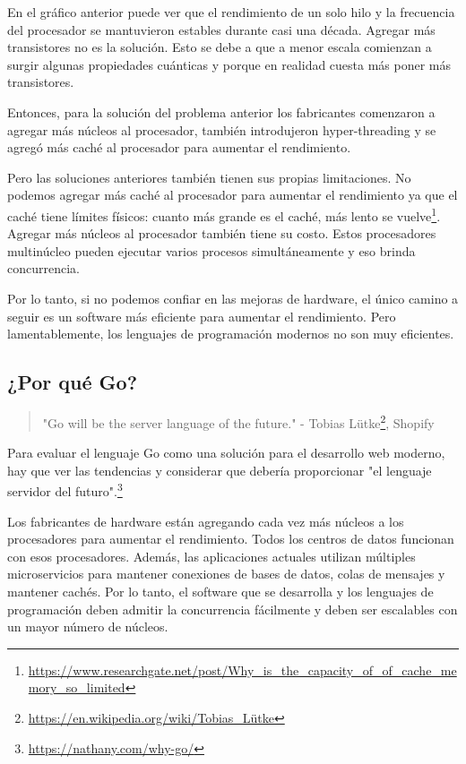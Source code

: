 \documentclass[twoside,twocolumn]{article}
\begin{document}
\noindent
En el gráfico anterior puede ver que el rendimiento de un solo hilo y la frecuencia del procesador se mantuvieron estables durante casi una década. Agregar más transistores no es la solución. Esto se debe a que a menor escala comienzan a surgir algunas propiedades cuánticas y porque en realidad cuesta más poner más transistores.

Entonces, para la solución del problema anterior los fabricantes comenzaron a agregar más núcleos al procesador, también introdujeron hyper-threading y se agregó más caché al procesador para aumentar el rendimiento.

Pero las soluciones anteriores también tienen sus propias limitaciones. No podemos agregar más caché al procesador para aumentar el rendimiento ya que el caché tiene límites físicos: cuanto más grande es el caché, más lento se vuelve\footnote{\url{https://www.researchgate.net/post/Why_is_the_capacity_of_of_cache_memory_so_limited}}. Agregar más núcleos al procesador también tiene su costo. Estos procesadores multinúcleo pueden ejecutar varios procesos simultáneamente y eso brinda concurrencia.

Por lo tanto, si no podemos confiar en las mejoras de hardware, el único camino a seguir es un software más eficiente para aumentar el rendimiento. Pero lamentablemente, los lenguajes de programación modernos no son muy eficientes.


\subsection{¿Por qué Go?}

\begin{quote}

	\small "Go will be the server language of the future." - Tobias Lütke\footnote{\url{https://en.wikipedia.org/wiki/Tobias_Lütke}}, Shopify

\end{quote}

\noindent
Para evaluar el lenguaje Go como una solución para el desarrollo web moderno, hay que ver las tendencias y considerar que debería proporcionar "el lenguaje servidor del futuro".\footnote{\url{https://nathany.com/why-go/}}

Los fabricantes de hardware están agregando cada vez más núcleos a los procesadores para aumentar el rendimiento. Todos los centros de datos funcionan con esos procesadores. Además, las aplicaciones actuales utilizan múltiples microservicios para mantener conexiones de bases de datos, colas de mensajes y mantener cachés. Por lo tanto, el software que se desarrolla y los lenguajes de programación deben admitir la concurrencia fácilmente y deben ser escalables con un mayor número de núcleos.
\end{document}
